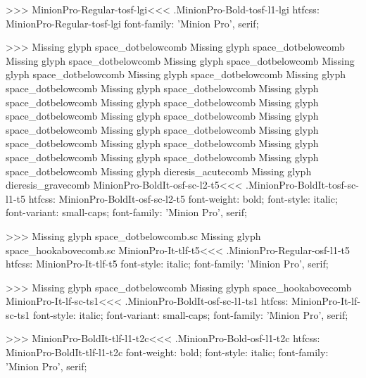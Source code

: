 {>>>
\<MinionPro-Regular-tosf-lgi\><<<
.MinionPro-Bold-tosf-l1-lgi
htfcss:  MinionPro-Regular-tosf-lgi  font-family: 'Minion Pro', serif;

>>>
Missing glyph	space_dotbelowcomb
Missing glyph	space_dotbelowcomb
Missing glyph	space_dotbelowcomb
Missing glyph	space_dotbelowcomb
Missing glyph	space_dotbelowcomb
Missing glyph	space_dotbelowcomb
Missing glyph	space_dotbelowcomb
Missing glyph	space_dotbelowcomb
Missing glyph	space_dotbelowcomb
Missing glyph	space_dotbelowcomb
Missing glyph	space_dotbelowcomb
Missing glyph	space_dotbelowcomb
Missing glyph	space_dotbelowcomb
Missing glyph	space_dotbelowcomb
Missing glyph	space_dotbelowcomb
Missing glyph	space_dotbelowcomb
Missing glyph	space_dotbelowcomb
Missing glyph	space_dotbelowcomb
Missing glyph	space_dotbelowcomb
Missing glyph	dieresis_acutecomb
Missing glyph	dieresis_gravecomb
\<MinionPro-BoldIt-osf-sc-l2-t5\><<<
.MinionPro-BoldIt-tosf-sc-l1-t5
htfcss:  MinionPro-BoldIt-osf-sc-l2-t5  font-weight: bold; font-style: italic; font-variant: small-caps; font-family: 'Minion Pro', serif;

>>>
Missing glyph	space_dotbelowcomb.sc
Missing glyph	space_hookabovecomb.sc
\<MinionPro-It-tlf-t5\><<<
.MinionPro-Regular-osf-l1-t5
htfcss:  MinionPro-It-tlf-t5  font-style: italic; font-family: 'Minion Pro', serif;

>>>
Missing glyph	space_dotbelowcomb
Missing glyph	space_hookabovecomb
\<MinionPro-It-lf-sc-ts1\><<<
.MinionPro-BoldIt-osf-sc-l1-ts1
htfcss:  MinionPro-It-lf-sc-ts1  font-style: italic; font-variant: small-caps; font-family: 'Minion Pro', serif;

>>>
\<MinionPro-BoldIt-tlf-l1-t2c\><<<
.MinionPro-Bold-osf-l1-t2c
htfcss:  MinionPro-BoldIt-tlf-l1-t2c  font-weight: bold; font-style: italic; font-family: 'Minion Pro', serif;

}
